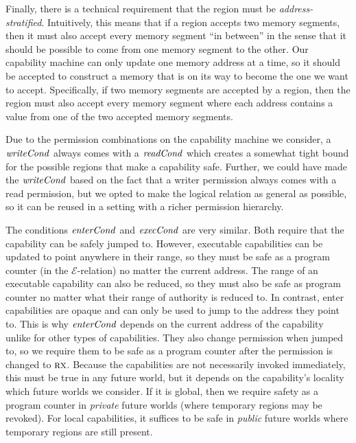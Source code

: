 \documentclass[format=acmsmall, review=true, screen=true]{acmart}
\newcommand{\plainfun}[2]{
  \ifthenelse{\equal{#2}{}}
  {\mathit{#1}}
  {\mathit{#1}(#2)}
}
\newcommand{\readCond}[1]{\plainfun{readCond}{#1}}
\newcommand{\writeCond}[1]{\plainfun{writeCond}{#1}}
\newcommand{\execCond}[1]{\plainfun{execCond}{#1}}
\newcommand{\entryCond}[1]{\plainfun{enterCond}{#1}}
\newcommand{\asmType}{\plaindom{AsmType}}
\newcommand{\plaindom}[1]{\mathrm{#1}}
\newcommand{\intr}[2]{\mathcal{#1}}
\newcommand{\exprintr}[1]{\intr{E}{#1}}
\newcommand{\stder}{\exprintr{\asmType}}
\newcommand{\plainperm}[1]{\textsc{#1}}
\newcommand{\exec}{\plainperm{rx}}
\newenvironment{toplas}%
    {\color{OliveGreen}}{}
\newcommand{\itoplas}[1]%
    {{\color{OliveGreen} #1}}
\begin{document}
Finally, there is a technical requirement that the region must be \emph{address-stratified}.
Intuitively, this means that if a region accepts two memory segments, then it must also accept every memory segment ``in between'' in the sense that it should be possible to come from one memory segment to the other.
Our capability machine can only update one memory address at a time, so it should be accepted to construct a memory that is on its way to become the one we want to accept.
Specifically, if two memory segments are accepted by a region, then the region must also accept every memory segment where each address contains a value from one of the two accepted memory segments.

Due to the permission combinations on the capability machine we consider, a $\writeCond{}$ always comes with a $\readCond{}$ which creates a somewhat tight bound for the possible regions that make a capability safe.
Further, we could have made the $\writeCond{}$ based on the fact that a writer permission always comes with a read permission, but we opted to make the logical relation as general as possible, so it can be reused in a setting with a richer permission hierarchy.

The conditions $\entryCond{}$ and $\execCond{}$ are very similar. Both require
that the capability can be safely jumped to. However, executable capabilities
can be updated to point anywhere in their range, so they must be safe as a
program counter (in the $\stder$-relation) no matter the current address.
\itoplas{The range of an executable capability can also be reduced, so they must also be safe as program counter no matter what their range of authority is reduced to.}
In contrast, enter capabilities are opaque and can only be used to jump to the
address they point to.
%
\begin{toplas}%
  This is why $\entryCond{}$ depends on the current address of the capability unlike for other types of capabilities.
\end{toplas}
They also change permission when jumped to, so we require
them to be safe as a program counter after the permission is changed to $\exec$.
Because the capabilities are not necessarily invoked immediately, this must be
true in any future world, but it depends on the capability's locality which
future worlds we consider. If it is global, then we require safety as a program
counter in \emph{private} future worlds (where temporary regions may be
revoked). For local capabilities, it suffices to be safe in \emph{public} future
worlds where temporary regions are still present.
\end{document}
